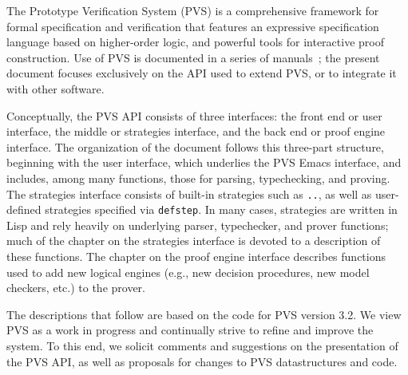 \documentclass[12pt]{book}
\begin{document}
The Prototype Verification System (PVS) is a comprehensive framework for
formal specification and verification that features an expressive
specification language based on higher-order logic, and powerful tools for
interactive proof construction.  Use of PVS is documented in a series of
manuals~\cite{PVS:userguide,PVS:language,PVS:prover}; the present document
focuses exclusively on the API used to extend PVS, or to integrate it with
other software.

Conceptually, the PVS API consists of three interfaces: the front end
or user interface, the middle or strategies interface, and the back
end or proof engine interface. The organization of the document
follows this three-part structure, beginning with the user interface,
which underlies the PVS Emacs interface, and includes, among many
functions, those for parsing, typechecking, and proving. The
strategies interface consists of built-in strategies such as {\tt ..},
as well as user-defined strategies specified via {\tt defstep}. In
many cases, strategies are written in Lisp and rely heavily on
underlying parser, typechecker, and prover functions; much of the
chapter on the strategies interface is devoted to a description of
these functions. The chapter on the proof engine interface describes
functions used to add new logical engines (e.g., new decision
procedures, new model checkers, etc.) to the prover.

The descriptions that follow are based on the code for PVS version
3.2.  We view PVS as a work in progress and continually strive to
refine and improve the system. To this end, we solicit comments and
suggestions on the presentation of the PVS API, as well as proposals
for changes to PVS datastructures and code.



\end{document}
